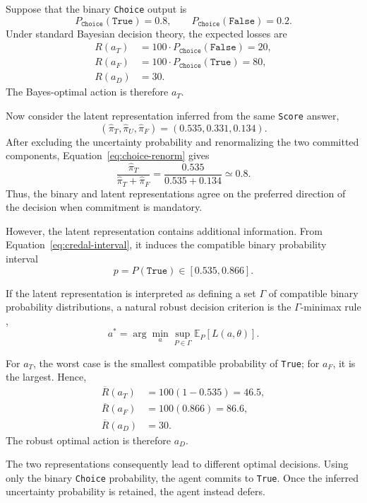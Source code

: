 \documentclass[twoside]{article}
\begin{document}
Suppose that the binary \texttt{Choice} output is
\[
P_{\texttt{Choice}}(\texttt{True})=0.8,
\qquad
P_{\texttt{Choice}}(\texttt{False})=0.2.
\]
Under standard Bayesian decision theory, the expected losses are
\begin{align*}
R(a_T)
    &=100\cdot P_{\texttt{Choice}}(\texttt{False})
      =20,\\
R(a_F)
    &=100\cdot P_{\texttt{Choice}}(\texttt{True})
      =80,\\
R(a_D)
    &=30.
\end{align*}
The Bayes-optimal action is therefore $a_T$.

Now consider the latent representation inferred from the same
\texttt{Score} answer,
\[
(\widehat{\pi}_T,
 \widehat{\pi}_U,
 \widehat{\pi}_F)
=
(0.535,0.331,0.134).
\]
After excluding the uncertainty probability and renormalizing the two
committed components, Equation~\ref{eq:choice-renorm} gives
\[
\frac{\widehat{\pi}_T}
     {\widehat{\pi}_T+\widehat{\pi}_F}
=
\frac{0.535}{0.535+0.134}
\simeq0.8.
\]
Thus, the binary and latent representations agree on the preferred
direction of the decision when commitment is mandatory.

However, the latent representation contains additional information.
From Equation~\ref{eq:credal-interval}, it induces the compatible
binary probability interval
\[
p=P(\texttt{True})
\in
[0.535,0.866].
\]

If the latent representation is interpreted as defining a set
$\Gamma$ of compatible binary probability distributions, a natural
robust decision criterion is the $\Gamma$-minimax rule
\cite{berger1985statistical,walley1991statistical},
\begin{equation*}
a^*
=
\arg\min_{a}
\sup_{P\in\Gamma}
\mathbb{E}_{P}[L(a,\theta)].
\end{equation*}

For $a_T$, the worst case
is the smallest compatible probability of \texttt{True}; for $a_F$,
it is the largest. Hence,
\begin{align*}
\overline{R}(a_T)
    &=
    100(1-0.535)
    =
    46.5,\\
\overline{R}(a_F)
    &=
    100(0.866)
    =
    86.6,\\
\overline{R}(a_D)
    &=
    30.
\end{align*}
The robust optimal action is therefore
$a_D$.

The two representations consequently lead to different optimal
decisions. Using only the binary \texttt{Choice} probability, the
agent commits to \texttt{True}. Once the inferred uncertainty
probability is retained, the agent instead defers.
\end{document}
